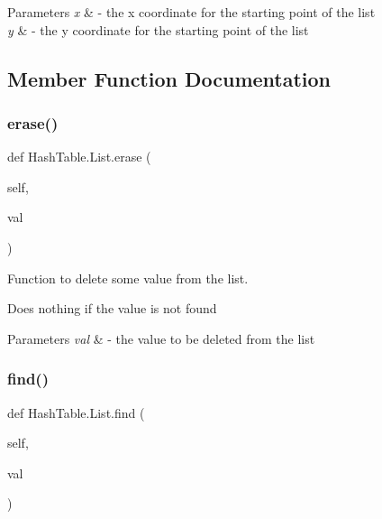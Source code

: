 \begin{DoxyParams}{Parameters}
{\em x} & -\/ the x coordinate for the starting point of the list \\
\hline
{\em y} & -\/ the y coordinate for the starting point of the list \\
\hline
\end{DoxyParams}


\subsection{Member Function Documentation}
\mbox{\label{class_hash_table_1_1_list_a173b36dbf5dab4c2c96290cec62e0d81}} 
\subsubsection{\texorpdfstring{erase()}{erase()}}
{\footnotesize\ttfamily def Hash\+Table.\+List.\+erase (\begin{DoxyParamCaption}\item[{}]{self,  }\item[{}]{val }\end{DoxyParamCaption})}



Function to delete some value from the list. 

Does nothing if the value is not found


\begin{DoxyParams}{Parameters}
{\em val} & -\/ the value to be deleted from the list \\
\hline
\end{DoxyParams}
\mbox{\label{class_hash_table_1_1_list_a274cd4a837d3859cb8d20553a928fd1b}} 
\subsubsection{\texorpdfstring{find()}{find()}}
{\footnotesize\ttfamily def Hash\+Table.\+List.\+find (\begin{DoxyParamCaption}\item[{}]{self,  }\item[{}]{val }\end{DoxyParamCaption})}



